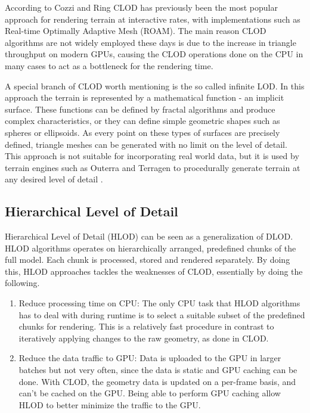 According to Cozzi and Ring \cite[p. 368]{cozzi11} CLOD has previously been the most popular approach for rendering terrain at interactive rates, with implementations such as Real-time Optimally Adaptive Mesh (ROAM). The main reason CLOD algorithms are not widely employed these days is due to the increase in triangle throughput on modern GPUs, causing the CLOD operations done on the CPU in many cases to act as a bottleneck for the rendering time.

A special branch of CLOD worth mentioning is the so called infinite LOD. In this approach the terrain is represented by a mathematical function - an implicit surface. These functions can be defined by fractal algorithms and produce complex characteristics, or they can define simple geometric shapes such as spheres or ellipsoids. As every point on these types of surfaces are precisely defined, triangle meshes can be generated with no limit on the level of detail. This approach is not suitable for incorporating real world data, but it is used by terrain engines such as Outerra and Terragen to procedurally generate terrain at any desired level of detail \cite{outerraprocedural09}. 

\subsection{Hierarchical Level of Detail}
\label{section:hlod}
Hierarchical Level of Detail (HLOD) can be seen as a generalization of DLOD. HLOD algorithms operates on hierarchically arranged, predefined chunks of the full model. Each chunk is processed, stored and rendered separately. By doing this, HLOD approaches tackles the weaknesses of CLOD, essentially by doing the following.

\begin{enumerate}
    \item Reduce processing time on CPU: The only CPU task that HLOD algorithms has to deal with during runtime is to select a suitable subset of the predefined chunks for rendering. This is a relatively fast procedure in contrast to iteratively applying changes to the raw geometry, as done in CLOD.
    \item Reduce the data traffic to GPU: Data is uploaded to the GPU in larger batches but not very often, since the data is static and GPU caching can be done. With CLOD, the geometry data is updated on a per-frame basis, and can't be cached on the GPU. Being able to perform GPU caching allow HLOD to better minimize the traffic to the GPU.
\end{enumerate}

